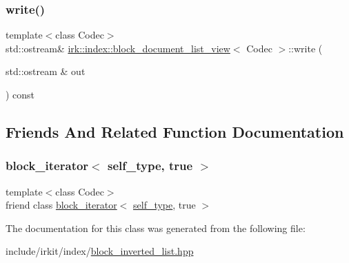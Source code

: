 \subsubsection{\texorpdfstring{write()}{write()}}
{\footnotesize\ttfamily template$<$class Codec$>$ \\
std\+::ostream\& \mbox{\hyperlink{classirk_1_1index_1_1block__document__list__view}{irk\+::index\+::block\+\_\+document\+\_\+list\+\_\+view}}$<$ Codec $>$\+::write (\begin{DoxyParamCaption}\item[{std\+::ostream \&}]{out }\end{DoxyParamCaption}) const\hspace{0.3cm}{\ttfamily [inline]}}



\subsection{Friends And Related Function Documentation}
\mbox{\label{classirk_1_1index_1_1block__document__list__view_a9e9d706e71ebb8b3d20137fb0121c8bd}} 
\subsubsection{\texorpdfstring{block\+\_\+iterator$<$ self\+\_\+type, true $>$}{block\_iterator< self\_type, true >}}
{\footnotesize\ttfamily template$<$class Codec$>$ \\
friend class \mbox{\hyperlink{classirk_1_1index_1_1block__iterator}{block\+\_\+iterator}}$<$ \mbox{\hyperlink{classirk_1_1index_1_1block__document__list__view_aaf5438363796f98a08a115e2a6316659}{self\+\_\+type}}, true $>$\hspace{0.3cm}{\ttfamily [friend]}}



The documentation for this class was generated from the following file\+:\begin{DoxyCompactItemize}
\item 
include/irkit/index/\mbox{\hyperlink{block__inverted__list_8hpp}{block\+\_\+inverted\+\_\+list.\+hpp}}\end{DoxyCompactItemize}
